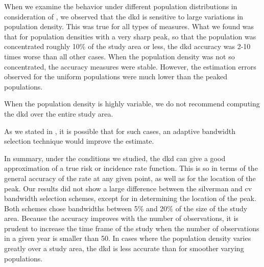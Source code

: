 When we examine the behavior under different population distributions in consideration of ,
we observed that the \gls{dkd} is sensitive to large variations in population density.
This was true for all types of measures.
What we found was that for population densities with a very sharp peak,
so that the population was concentrated roughly 10\% of the study area or less,
the \gls{dkd} accuracy was 2-10 times worse than all other cases.
When the population density was not so concentrated,
the accuracy measures were stable.
However,
the estimation errors observed for the uniform populations were much lower than the peaked populations.
\begin{rec}
    \label{rec:pop-density}
    When the population density is highly variable,
    we do not recommend computing the \gls{dkd} over the entire study area.
\end{rec}
As we stated in ,
it is possible that for such cases,
an adaptive bandwidth selection technique would improve the estimate.

In summary,
under the conditions we studied,
the \gls{dkd} can give a good approximation of a true \gls{risk} or \gls{incidence rate} function.
This is so in terms of the general accuracy of the rate at any given point,
as well as for the location of the peak.
Our results did not show a large difference between the \gls{silverman} and \gls{cv} bandwidth selection schemes,
except for in determining the location of the peak.
Both schemes chose bandwidths between 5\% and 20\% of the size of the study area.
Because the accuracy improves with the number of observations,
it is prudent to increase the time frame of the study when the number of observations in a given year is smaller than 50.
In cases where the population density varies greatly over a study area,
the \gls{dkd} is less accurate than for smoother varying populations.

